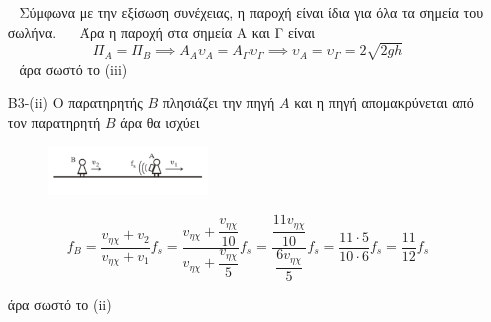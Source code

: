 \documentclass[12pt]{article}
\begin{document}
\begin{enumerate}
    Σύμφωνα με την εξίσωση συνέχειας, η παροχή είναι ίδια για όλα τα σημεία του σωλήνα.
    Άρα η παροχή στα σημεία Α και Γ είναι
    $$Π_Α = Π_Β \implies A_A υ_Α = Α_Γ υ_Γ \implies υ_Α = υ_Γ = 2 \sqrt{2gh}$$
    άρα σωστό το (iii)

    \item [B3-(ii)]
    Ο παρατηρητής $Β$ πλησιάζει την πηγή $Α$ και η πηγή απομακρύνεται από τον παρατηρητή $Β$ άρα θα ισχύει

    \begin{figure}[h]
      \includegraphics[width=0.4\textwidth]{ΦυσικήΒ3.png}
      \centering
    \end{figure}

    $$f_Β=\dfrac{v_{ηχ}+v_2}{v_{ηχ}+v_1}f_s=\dfrac{v_{ηχ}+\dfrac{v_{ηχ}}{10}}{v_{ηχ}+\dfrac{v_{ηχ}}{5}}f_s= \dfrac{\dfrac{11v_{ηχ}}{10}}{\dfrac{6v_{ηχ}}{5}}f_s=\dfrac{11\cdot5}{10\cdot6}f_s=\dfrac{11}{12}f_s $$

    άρα σωστό το (ii)
  \end{enumerate}
\end{document}
